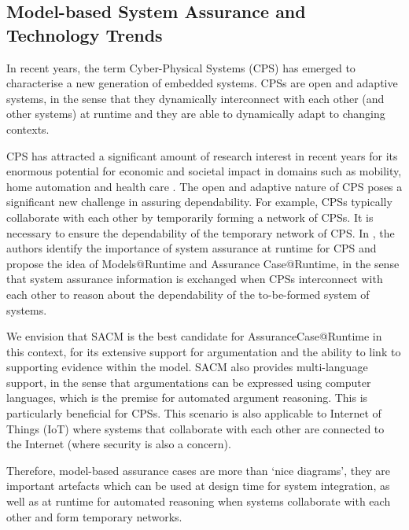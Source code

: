 \subsection{Model-based System Assurance and Technology Trends}

In recent years, the term Cyber-Physical Systems (CPS) has emerged to characterise a new generation of embedded systems. 
CPSs are open and adaptive systems, in the sense that they dynamically interconnect with each other (and other systems) at runtime and they are able to dynamically adapt to changing contexts. 

CPS has attracted a significant amount of research interest in recent years for its enormous potential for economic and societal impact in domains such as mobility, home automation and health care \cite{wei2017deis}. 
The open and adaptive nature of CPS poses a significant new challenge in assuring dependability. 
For example, CPSs typically collaborate with each other by temporarily forming a network of CPSs. 
It is necessary to ensure the dependability of the temporary network of CPS.
In \cite{trapp2013safety}, the authors identify the importance of system assurance at runtime for CPS and propose the idea of Models@Runtime and Assurance Case@Runtime, in the sense that system assurance information is exchanged when CPSs interconnect with each other to reason about the dependability of the to-be-formed system of systems.

We envision that SACM is the best candidate for AssuranceCase@Runtime in this context, for its extensive support for argumentation and the ability to link to supporting evidence within the model. 
SACM also provides multi-language support, in the sense that argumentations can be expressed using computer languages, which is the premise for automated argument reasoning. This is particularly beneficial for CPSs.
This scenario is also applicable to Internet of Things (IoT) where systems that collaborate with each other are connected to the Internet (where security is also a concern). 

Therefore, model-based assurance cases are more than `nice diagrams', they are important artefacts which can be used at design time for system integration, as well as at runtime for automated reasoning when systems collaborate with each other and form temporary networks. 